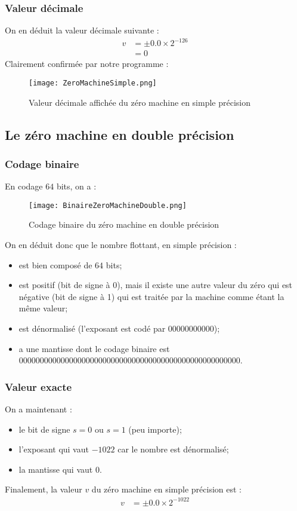 \documentclass[a4paper, titlepage]{livret} %
\begin{document}
				\subsubsection{Valeur décimale}
					On en déduit la valeur décimale suivante :
					\[\begin{aligned}
						v & = \pm 0.0 \times 2^{-126}\\
						  & = 0
					\end{aligned}\]
					Clairement confirmée par notre programme :
					\begin{figure}[!h]
						\centering
  							\texttt{[image: ZeroMachineSimple.png]}
  							\caption{Valeur décimale affichée du zéro machine en simple précision}
					\end{figure}

			\subsection{Le zéro machine en double précision}
				\subsubsection{Codage binaire}
					En codage $64$ bits, on a :
					\begin{figure}[!h]
						\centering
  							\texttt{[image: BinaireZeroMachineDouble.png]}
  							\caption{Codage binaire du zéro machine en double précision}
					\end{figure}

					On en déduit donc que le nombre flottant, en simple précision :
					\begin{itemize}
						\item est bien composé de $64$ bits;
						\item est positif (bit de signe à 0), mais il existe une autre valeur du zéro qui est négative (bit de signe à 1) qui est traitée par la machine comme étant la même valeur;
						\item est dénormalisé (l'exposant est codé par $00000000000$);
						\item a une mantisse dont le codage binaire est $00000000 00000000 00000000 00000000 00000000 00000000 00000$.
					\end{itemize}

				\subsubsection{Valeur exacte}
					On a maintenant : 
					\begin{itemize}
						\item le bit de signe $s = 0$ ou $s = 1$ (peu importe);
						\item l'exposant qui vaut $-1022$ car le nombre est dénormalisé;
						\item la mantisse qui vaut $0$.
					\end{itemize}
					Finalement, la valeur $v$ du zéro machine en simple précision est :
					\[\begin{aligned}
						v & = \pm 0.0 \times 2^{-1022}\\
					\end{aligned}\]
\end{document}
